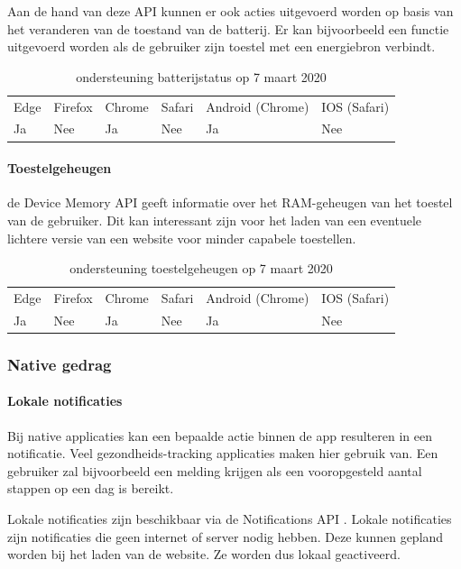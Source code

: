 Aan de hand van deze API kunnen er ook acties uitgevoerd worden op basis van het veranderen van de toestand van de batterij. Er kan bijvoorbeeld een functie uitgevoerd worden als de gebruiker zijn toestel met een energiebron verbindt.

\begin{table}[H]
	\centering
	\begin{tabular}{llllll}
		Edge & Firefox & Chrome & Safari & Android (Chrome) & IOS (Safari) \\
		Ja   & Nee      &  Ja     & Nee     & Ja               & Nee          
	\end{tabular}	
	\caption{ondersteuning batterijstatus op 7 maart 2020 }
\end{table}

\paragraph{Toestelgeheugen}
de Device Memory API \autocite{Panicker2018} geeft informatie over het RAM-geheugen van het toestel van de gebruiker. Dit kan interessant zijn voor het laden van een eventuele lichtere versie van een website voor minder capabele toestellen.

\begin{table}[H]
	\centering
	\begin{tabular}{llllll}
		Edge & Firefox & Chrome & Safari & Android (Chrome) & IOS (Safari) \\
		Ja   & Nee      &  Ja     & Nee     & Ja               & Nee          
	\end{tabular}	
	\caption{ondersteuning toestelgeheugen op 7 maart 2020}
\end{table}



\subsubsection{Native gedrag}

\paragraph{Lokale notificaties}
Bij native applicaties kan een bepaalde actie binnen de app resulteren in een notificatie. Veel gezondheids-tracking applicaties maken hier gebruik van. Een gebruiker zal bijvoorbeeld een melding krijgen als een vooropgesteld aantal stappen op een dag is bereikt.

Lokale notificaties zijn beschikbaar via de Notifications API \autocite{Gregg2015}. Lokale notificaties zijn notificaties die geen internet of server nodig hebben. Deze kunnen gepland worden bij het laden van de website. Ze worden dus lokaal geactiveerd.

